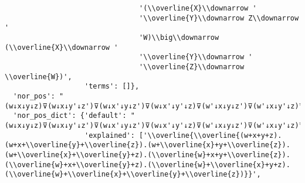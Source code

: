 \begin{verbatim}
                                '(\\overline{X}\\downarrow '
                                '\\overline{Y}\\downarrow Z\\downarrow '
                                'W)\\big\\downarrow (\\overline{X}\\downarrow '
                                '\\overline{Y}\\downarrow '
                                '\\overline{Z}\\downarrow \\overline{W})',
                   'terms': []},
  'nor_pos': "(w↓x↓y↓z)⊽(w↓x↓y'↓z')⊽(w↓x'↓y↓z')⊽(w↓x'↓y'↓z)⊽(w'↓x↓y↓z')⊽(w'↓x↓y'↓z)⊽(w'↓x'↓y↓z)⊽(w'↓x'↓y'↓z')",
  'nor_pos_dict': {'default': "(w↓x↓y↓z)⊽(w↓x↓y'↓z')⊽(w↓x'↓y↓z')⊽(w↓x'↓y'↓z)⊽(w'↓x↓y↓z')⊽(w'↓x↓y'↓z)⊽(w'↓x'↓y↓z)⊽(w'↓x'↓y'↓z')",
                   'explained': ['\\overline{\\overline{(w+x+y+z).(w+x+\\overline{y}+\\overline{z}).(w+\\overline{x}+y+\\overline{z}).(w+\\overline{x}+\\overline{y}+z).(\\overline{w}+x+y+\\overline{z}).(\\overline{w}+x+\\overline{y}+z).(\\overline{w}+\\overline{x}+y+z).(\\overline{w}+\\overline{x}+\\overline{y}+\\overline{z})}}',

\end{verbatim}

